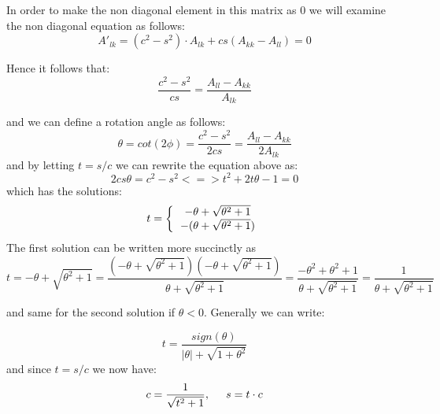 \documentclass[12pt,twoside]{article}
\begin{document}
In order to make the non diagonal element in this matrix as 0 we will examine the non diagonal equation as follows:\\
\begin{equation}
A'_{lk} = (c^2 - s^2) \cdot A_{lk} + cs(A_{kk}-A_{ll}) = 0
\end{equation}


Hence it follows that:\\
\begin{equation}
\frac{c^2-s^2}{cs} = \frac{A_{ll}-A_{kk}}{A_{lk}}
\end{equation}

and we can define a rotation angle as follows:\\
\begin{equation}
\theta = cot(2\phi) = \frac{c^2-s^2}{2cs} = \frac{A_{ll}-A_{kk}}{2A_{lk}}
\end{equation}
and by letting $t = s/c$ we can rewrite the equation above as:\\
\begin{equation}
2cs\theta = c^2 - s^2 <=>
t^2 + 2t\theta - 1 = 0
\end{equation}
which has the solutions:\\
\begin{equation}
t = 
\bigg\{
  \begin{tabular}{cc}
$ -\theta + \sqrt{\theta^2+1}$ \\
$ -(\theta + \sqrt{\theta^2+1})$ \\
  \end{tabular}
\end{equation}
The first solution can be written more succinctly as
\begin{equation}
t =  -\theta + \sqrt{\theta^2+1}  = \frac{ \left(-\theta + \sqrt{\theta^2+1}\right)\left(-\theta + \sqrt{\theta^2+1}\right) }{\theta + \sqrt{\theta^2+1}}
= \frac{ -\theta^2 + \theta^2 + 1 }{\theta + \sqrt{\theta^2+1}} = \frac{1}{\theta + \sqrt{\theta^2+1}}
\end{equation}

and same for the second solution if $\theta < 0$. Generally we can write:

\begin{equation}
t =  \frac{sign(\theta)}{|\theta|+ \sqrt{1+\theta^2}}
\end{equation}
and since $t=s/c$ we now have:\\
\begin{equation}
c =  \frac{1}{\sqrt{t^2+1}}, \hspace{5mm} s = t\cdot c
\end{equation}
\end{document}
